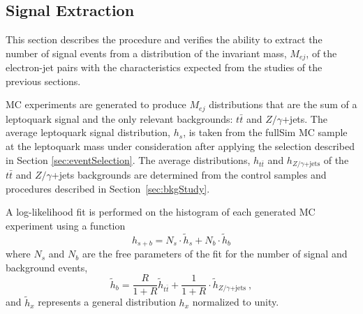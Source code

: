 \documentclass[colclass=cmspaper]{combine}
\begin{document}
\begin{linenumbers}





\section{Signal Extraction} \label{sec:signalExtraction}

This section describes the procedure and verifies the ability to extract the 
number of signal events from a distribution of the invariant mass, $M_{ej}$, of the 
electron-jet pairs with the characteristics expected from the studies 
of the previous sections.

MC experiments are generated to produce $M_{ej}$ distributions that are the sum
of a leptoquark signal and the only relevant backgrounds: $t\bar{t}$ and $Z/\gamma$+jets.
The average leptoquark signal distribution, $h_s$, is taken from the fullSim MC 
sample at the leptoquark mass under consideration after applying the selection
described in Section \ref{sec:eventSelection}.
The average distributions, $h_{t\bar{t}}$ and $h_{Z/\gamma\mathrm{+jets}}$ 
of the $t\bar{t}$ and $Z/\gamma$+jets backgrounds are determined from the control samples
and procedures described in Section~\ref{sec:bkgStudy}.

A log-likelihood fit is performed on the histogram of each generated MC experiment
using a function
\begin{displaymath}
  h_{s+b} = N_s \cdot \tilde{h}_s + N_b \cdot \tilde{h}_b
\end{displaymath}
where $N_s$ and $N_b$ are the free parameters of the fit for the number of signal and background events,
\begin{displaymath}
  \tilde{h}_b = \frac{R}{1+R} \tilde{h}_{t\bar{t}} + \frac{1}{1+R} \cdot \tilde{h}_{Z/\gamma\mathrm{+jets}}~\mathrm{,}
\end{displaymath}
and $\tilde{h}_x$ represents a general distribution $h_x$ normalized to unity. 


\end{linenumbers}
\end{document}
